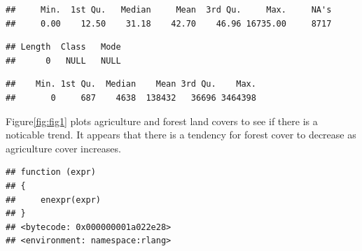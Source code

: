 \documentclass[12pt,]{article}
\newenvironment{Shaded}{\begin{snugshade}}{\end{snugshade}}
\newcommand{\KeywordTok}[1]{\textcolor[rgb]{0.13,0.29,0.53}{\textbf{#1}}}
\newcommand{\OperatorTok}[1]{\textcolor[rgb]{0.81,0.36,0.00}{\textbf{#1}}}
\newcommand{\NormalTok}[1]{#1}
\begin{document}
\begin{Shaded}
\end{Shaded}

\begin{verbatim}
##     Min.  1st Qu.   Median     Mean  3rd Qu.     Max.     NA's 
##     0.00    12.50    31.18    42.70    46.96 16735.00     8717
\end{verbatim}

\begin{Shaded}
\end{Shaded}

\begin{verbatim}
## Length  Class   Mode 
##      0   NULL   NULL
\end{verbatim}

\begin{Shaded}
\end{Shaded}

\begin{verbatim}
##    Min. 1st Qu.  Median    Mean 3rd Qu.    Max. 
##       0     687    4638  138432   36696 3464398
\end{verbatim}

Figure\ref{fig:fig1} plots agriculture and forest land covers to see if
there is a noticable trend. It appears that there is a tendency for
forest cover to decrease as agriculture cover increases.

\begin{verbatim}
## function (expr) 
## {
##     enexpr(expr)
## }
## <bytecode: 0x000000001a022e28>
## <environment: namespace:rlang>
\end{verbatim}
\end{document}
